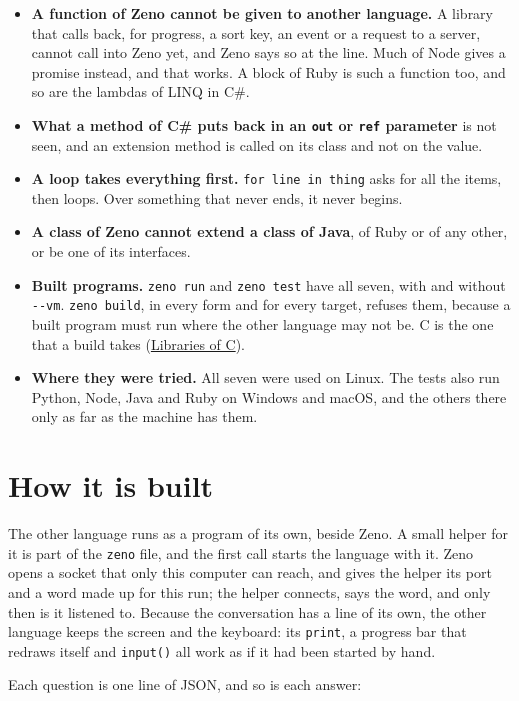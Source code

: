 \begin{itemize}
\item \textbf{A function of Zeno cannot be given to another language.}
  A library that calls back, for progress, a sort key, an event or a
  request to a server, cannot call into Zeno yet, and Zeno says so at
  the line. Much of Node gives a promise instead, and that works. A
  block of Ruby is such a function too, and so are the lambdas of
  LINQ in C\#.
\item \textbf{What a method of C\# puts back in an \texttt{out} or
  \texttt{ref} parameter} is not seen, and an extension method is
  called on its class and not on the value.
\item \textbf{A loop takes everything first.} \verb|for line in thing|
  asks for all the items, then loops. Over something that never ends,
  it never begins.
\item \textbf{A class of Zeno cannot extend a class of Java}, of Ruby
  or of any other, or be one of its interfaces.
\item \textbf{Built programs.} \verb|zeno run| and \verb|zeno test| have
  all seven, with and without \verb|--vm|. \verb|zeno build|, in every
  form and for every target, refuses them, because a built program
  must run where the other language may not be. C is the one that a
  build takes (\hyperref[ch-c-libraries]{Libraries of C}).
\item \textbf{Where they were tried.} All seven were used on Linux.
  The tests also run Python, Node, Java and Ruby on Windows and macOS,
  and the others there only as far as the machine has them.
\end{itemize}

\section{How it is built}

The other language runs as a program of its own, beside Zeno. A small
helper for it is part of the \verb|zeno| file, and the first call
starts the language with it. Zeno opens a socket that only this
computer can reach, and gives the helper its port and a word made up
for this run; the helper connects, says the word, and only then is it
listened to. Because the conversation has a line of its own, the
other language keeps the screen and the keyboard: its \verb|print|, a
progress bar that redraws itself and \verb|input()| all work as if it
had been started by hand.

Each question is one line of JSON, and so is each answer:

